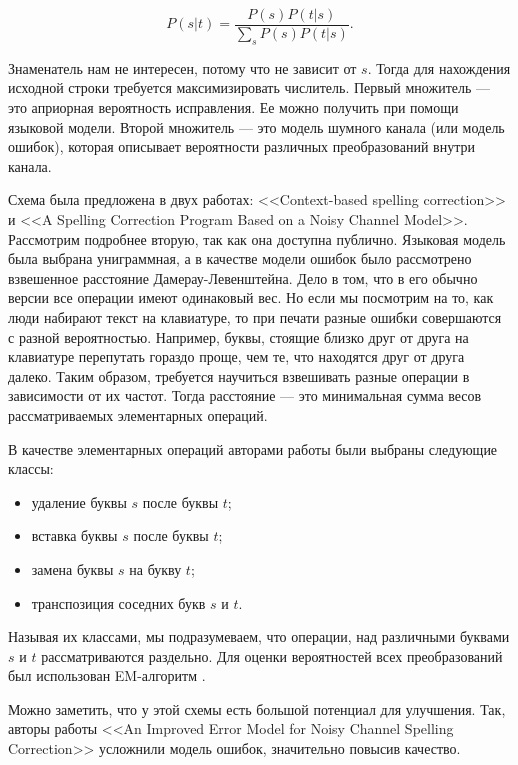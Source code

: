 \begin{equation*}
	P(s|t) = \frac{P(s) P(t|s)}{\sum\limits_{s} P(s) P(t|s)}.
\end{equation*}

Знаменатель нам не интересен, потому что не зависит от $s$. Тогда для нахождения исходной строки требуется максимизировать числитель. Первый множитель --- это априорная вероятность исправления. Ее можно получить при помощи языковой модели. Второй множитель --- это модель шумного канала (или модель ошибок), которая описывает вероятности различных преобразований внутри канала. 

Схема была предложена в двух работах: <<Context-based spelling correction>> \cite{Mays1991} и <<A Spelling Correction Program Based on a Noisy Channel Model>>\cite{Kernighan1990}. Рассмотрим подробнее вторую, так как она доступна публично. Языковая модель была выбрана униграммная, а в качестве модели ошибок было рассмотрено взвешенное расстояние Дамерау-Левенштейна. Дело в том, что в его обычно версии все операции имеют одинаковый вес. Но если мы посмотрим на то, как люди набирают текст на клавиатуре, то при печати разные ошибки совершаются с разной вероятностью. Например, буквы, стоящие близко друг от друга на клавиатуре перепутать гораздо проще, чем те, что находятся друг от друга далеко. Таким образом, требуется научиться взвешивать разные операции в зависимости от их частот. Тогда расстояние --- это минимальная сумма весов рассматриваемых элементарных операций. 

В качестве элементарных операций авторами работы были выбраны следующие классы:
\begin{itemize}
	\item удаление буквы $s$ после буквы $t$;
	\item вставка буквы $s$ после буквы $t$;
	\item замена буквы $s$ на букву $t$;
	\item транспозиция соседних букв $s$ и $t$.
\end{itemize}

Называя их классами, мы подразумеваем, что операции, над различными буквами $s$ и $t$ рассматриваются раздельно. Для оценки вероятностей всех преобразований был использован EM-алгоритм \cite{Dempster1977}.

Можно заметить, что у этой схемы есть большой потенциал для улучшения. Так, авторы работы <<An Improved Error Model for Noisy Channel Spelling Correction>> \cite{Brill2000} усложнили модель ошибок, значительно повысив качество.

